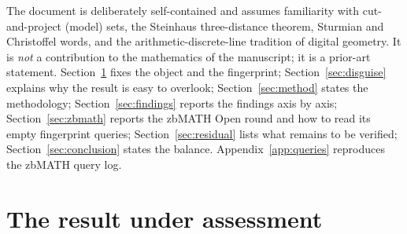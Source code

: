 \documentclass[11pt]{article}
\theoremstyle{plain}
\theoremstyle{remark}
\begin{document}
The document is deliberately self-contained and assumes familiarity with
cut-and-project (model) sets, the Steinhaus three-distance theorem, Sturmian and
Christoffel words, and the arithmetic-discrete-line tradition of digital geometry.
It is \emph{not} a contribution to the mathematics of the manuscript; it is a prior-art
statement. Section~\ref{sec:result} fixes the object and the fingerprint;
Section~\ref{sec:disguise} explains why the result is easy to overlook;
Section~\ref{sec:method} states the methodology;
Section~\ref{sec:findings} reports the findings axis by axis;
Section~\ref{sec:zbmath} reports the zbMATH Open round and how to read its empty
fingerprint queries; Section~\ref{sec:residual} lists what remains to be verified;
Section~\ref{sec:conclusion} states the balance. Appendix~\ref{app:queries}
reproduces the zbMATH query log.

\section{The result under assessment}\label{sec:result}
\end{document}

